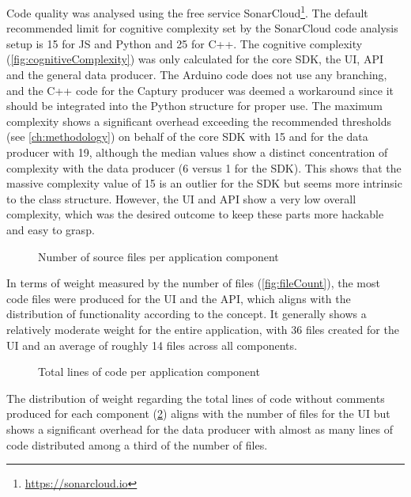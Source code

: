 Code quality was analysed using the free service SonarCloud\footnote{\url{https://sonarcloud.io}}.
The default recommended limit for cognitive complexity set by the SonarCloud code analysis setup is 15 for \ac{JS} and Python and 25 for C++.
The cognitive complexity (\ref{fig:cognitiveComplexity}) was only calculated for the core \ac{SDK}, the \ac{UI}, \ac{API} and the general data producer.
The Arduino code does not use any branching, and the C++ code for the Captury producer was deemed a workaround since it should be integrated into the Python structure for proper use.
The maximum complexity shows a significant overhead exceeding the recommended thresholds (see \autoref{ch:methodology}) on behalf of the core \ac{SDK} with 15 and for the data producer with 19, although the median values show a distinct concentration of complexity with the data producer (6 versus 1 for the \ac{SDK}).
This shows that the massive complexity value of 15 is an outlier for the \ac{SDK} but seems more intrinsic to the  class structure.
However, the \ac{UI} and \ac{API} show a very low overall complexity, which was the desired outcome to keep these parts more hackable and easy to grasp.

\begin{figure}[h]
\centering

\caption[File count]{Number of source files per application component\protect}
\label{fig:fileCount}
\end{figure}

In terms of weight measured by the number of files (\autoref{fig:fileCount}), the most code files were produced for the \ac{UI} and the \ac{API}, which aligns with the distribution of functionality according to the concept.
It generally shows a relatively moderate weight for the entire application, with 36 files created for the \ac{UI} and an average of roughly 14 files across all components.

\begin{figure}[h]
\centering

\caption[Lines of code (total)]{Total lines of code per application component\protect}
\label{fig:linesOfCodeTotal}
\end{figure}

The distribution of weight regarding the total lines of code without comments produced for each component (\ref{fig:linesOfCodeTotal}) aligns with the number of files for the \ac{UI} but shows a significant overhead for the data producer with almost as many lines of code distributed among a third of the number of files.

